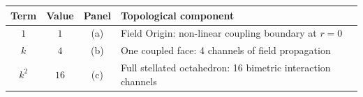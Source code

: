\documentclass[aps,prd,preprint,superscriptaddress,showpacs,preprintnumbers,amsmath,amssymb,nofootinbib]{revtex4-2}
\begin{document}
\begin{center}
\renewcommand{\arraystretch}{1.4}
\begin{tabular*}{\textwidth}{@{\extracolsep{\fill}} cccl}
\hline
\textbf{Term} & \textbf{Value} & \textbf{Panel} & \textbf{Topological component} \\
\hline
$1$ & $1$ & (a) & Field Origin: non-linear coupling boundary at $r = 0$ \\
$k$ & $4$ & (b) & One coupled face: 4 channels of field propagation \\
$k^2$ & $16$ & (c) & Full stellated octahedron: 16 bimetric interaction channels \\
\hline
\end{tabular*}
\end{center}

\end{document}
